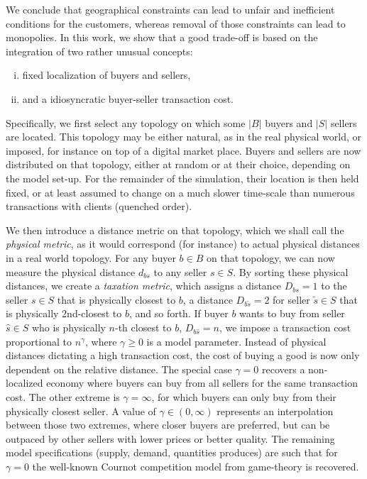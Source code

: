 \documentclass[a4paper,12pt]{article}
\begin{document}
We conclude that geographical constraints can lead to unfair and inefficient conditions for the customers, whereas removal of those constraints can lead to monopolies. 
In this work, we show that a good trade-off is based on the integration of two rather unusual concepts:
\begin{enumerate}[(i),topsep=0pt,itemsep=-1ex,partopsep=1ex,parsep=1ex]
	
	\item fixed localization of buyers and sellers, 
	
	\item and a idiosyncratic buyer-seller transaction cost.

\end{enumerate}

Specifically, we first select any topology on which some $|B|$ buyers and $|S|$ sellers are located. 
This topology may be either natural, as in the real physical world, or imposed, for instance on top of a digital market place.  
Buyers and sellers are now distributed on that topology, either at random or at their choice, depending on the model set-up. 
For the remainder of the simulation, their location is then held fixed, or at least assumed to change on a much slower time-scale than numerous transactions with clients (quenched order). 

We then introduce a distance metric on that topology, which we shall call the \textit{physical metric}, as it would correspond (for instance) to actual physical distances in a real world topology. 
For any buyer $b \in B$ on that topology, we can now measure the physical distance $d_{bs}$ to any seller $s \in S$. 
By sorting these physical distances, we create a \textit{taxation metric}, which assigns a distance $D_{bs}=1$ to the seller $s \in S$ that is physically closest to $b$, a distance $D_{b\tilde{s}}=2$ for seller $\tilde{s} \in S$ that is physically 2nd-closest to $b$, and so forth. 
If buyer $b$ wants to buy from seller $\hat{s} \in S$ who is physically $n$-th closest to $b$, $D_{b \hat{s}}=n$, 
we impose a transaction cost proportional to $n^\gamma$, where $\gamma \geqslant 0$ is a model parameter. 
Instead of physical distances dictating a high transaction cost, the cost of buying a good is now only dependent on the relative distance. 
The special case $\gamma = 0$ recovers a non-localized economy where buyers can buy from all sellers for the same transaction cost. 
The other extreme is $\gamma=\infty$, for which buyers can only buy from their physically closest seller. 
A value of $\gamma \in (0, \infty)$ represents an interpolation between those two extremes, where closer buyers are preferred, but can be outpaced by other sellers with lower prices or better quality. 
The remaining model specifications (supply, demand, quantities produces) are such that for $\gamma = 0$ the well-known Cournot competition model from game-theory is recovered. 
\end{document}
